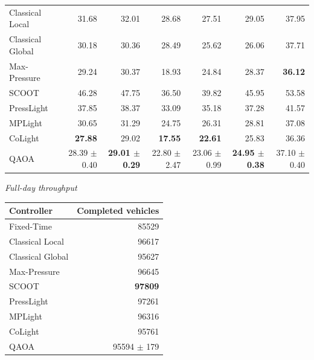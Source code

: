\begin{table}[htbp]
{\begin{tabular}{lrrrrrr}
Classical Local & 31.68 & 32.01 & 28.68 & 27.51 & 29.05 & 37.95 \\
Classical Global & 30.18 & 30.36 & 28.49 & 25.62 & 26.06 & 37.71 \\
Max-Pressure & 29.24 & 30.37 & 18.93 & 24.84 & 28.37 & \textbf{36.12} \\
SCOOT & 46.28 & 47.75 & 36.50 & 39.82 & 45.95 & 53.58 \\
PressLight & 37.85 & 38.37 & 33.09 & 35.18 & 37.28 & 41.57 \\
MPLight & 30.65 & 31.29 & 24.75 & 26.31 & 28.81 & 37.08 \\
CoLight & \textbf{27.88} & 29.02 & \textbf{17.55} & \textbf{22.61} & 25.83 & 36.36 \\
QAOA & 28.39 $\pm$ 0.40 & \textbf{29.01 $\pm$ 0.29} & 22.80 $\pm$ 2.47 & 23.06 $\pm$ 0.99 & \textbf{24.95 $\pm$ 0.38} & 37.10 $\pm$ 0.40 \\
\bottomrule
\end{tabular}%
}
\vspace{5pt}
\textit{Full-day throughput}\\[2pt]
\begin{tabular}{lr}
\toprule
Controller & Completed vehicles \\
\midrule
Fixed-Time & 85529 \\
Classical Local & 96617 \\
Classical Global & 95627 \\
Max-Pressure & 96645 \\
SCOOT & \textbf{97809} \\
PressLight & 97261 \\
MPLight & 96316 \\
CoLight & 95761 \\
QAOA & 95594 $\pm$ 179 \\
\bottomrule
\end{tabular}
\end{table}


